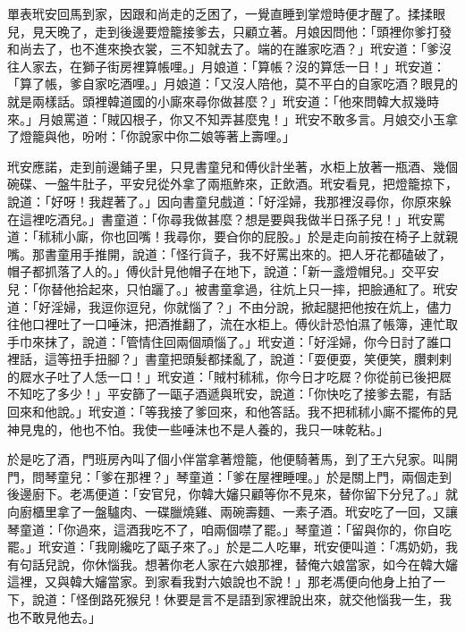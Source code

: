 單表玳安回馬到家，因跟和尚走的乏困了，一覺直睡到掌燈時便才醒了。揉揉眼兒，見天晚了，走到後邊要燈籠接爹去，只顧立著。月娘因問他：「頭裡你爹打發和尚去了，也不進來換衣裳，三不知就去了。端的在誰家吃酒？」玳安道：「爹沒往人家去，在獅子街房裡算帳哩。」月娘道：「算帳？沒的算恁一日！」玳安道：「算了帳，爹自家吃酒哩。」月娘道：「又沒人陪他，莫不平白的自家吃酒？眼見的就是兩樣話。頭裡韓道國的小廝來尋你做甚麼？」玳安道：「他來問韓大叔幾時來。」月娘罵道：「賊囚根子，你又不知弄甚麼鬼！」玳安不敢多言。月娘交小玉拿了燈籠與他，吩咐：「你說家中你二娘等著上壽哩。」

玳安應諾，走到前邊鋪子里，只見書童兒和傅伙計坐著，水柜上放著一瓶酒、幾個碗碟、一盤牛肚子，平安兒從外拿了兩瓶鮓來，正飲酒。玳安看見，把燈籠掠下，說道：「好呀！我趕著了。」因向書童兒戲道：「好淫婦，我那裡沒尋你，你原來躲在這裡吃酒兒。」書童道：「你尋我做甚麼？想是要與我做半日孫子兒！」玳安罵道：「秫秫小廝，你也回嘴！我尋你，要㒲你的屁股。」於是走向前按在椅子上就親嘴。那書童用手推開，說道：「怪行貨子，我不好罵出來的。把人牙花都磕破了，帽子都抓落了人的。」傅伙計見他帽子在地下，說道：「新一盞燈帽兒。」交平安兒：「你替他拾起來，只怕躧了。」被書童拿過，往炕上只一摔，把臉通紅了。玳安道：「好淫婦，我逗你逗兒，你就惱了？」不由分說，掀起腿把他按在炕上，儘力往他口裡吐了一口唾沫，把酒推翻了，流在水柜上。傅伙計恐怕濕了帳簿，連忙取手巾來抹了，說道：「管情住回兩個頑惱了。」玳安道：「好淫婦，你今日討了誰口裡話，這等扭手扭腳？」書童把頭髮都揉亂了，說道：「耍便耍，笑便笑，臢剌剌的㞞水子吐了人恁一口！」玳安道：「賊村秫秫，你今日才吃㞞？你從前已後把㞞不知吃了多少！」平安篩了一甌子酒遞與玳安，說道：「你快吃了接爹去罷，有話回來和他說。」玳安道：「等我接了爹回來，和他答話。我不把秫秫小廝不擺佈的見神見鬼的，他也不怕。我使一些唾沫也不是人養的，我只一味乾粘。」

於是吃了酒，門班房內叫了個小伴當拿著燈籠，他便騎著馬，到了王六兒家。叫開門，問琴童兒：「爹在那裡？」琴童道：「爹在屋裡睡哩。」於是關上門，兩個走到後邊廚下。老馮便道：「安官兒，你韓大嬸只顧等你不見來，替你留下分兒了。」就向廚櫃里拿了一盤驢肉、一碟臘燒雞、兩碗壽麵、一素子酒。玳安吃了一回，又讓琴童道：「你過來，這酒我吃不了，咱兩個噤了罷。」琴童道：「留與你的，你自吃罷。」玳安道：「我剛纔吃了甌子來了。」於是二人吃畢，玳安便叫道：「馮奶奶，我有句話兒說，你休惱我。想著你老人家在六娘那裡，替俺六娘當家，如今在韓大嬸這裡，又與韓大嬸當家。到家看我對六娘說也不說！」那老馮便向他身上拍了一下，說道：「怪倒路死猴兒！休要是言不是語到家裡說出來，就交他惱我一生，我也不敢見他去。」

